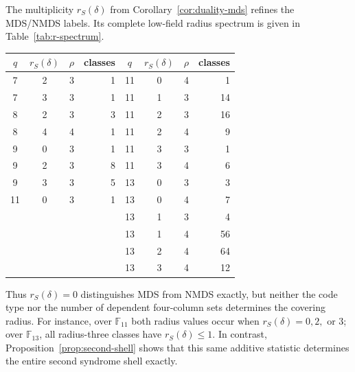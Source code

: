 \documentclass[11pt]{article}
\newcommand{\F}{\mathbb F}
\theoremstyle{plain}
\theoremstyle{definition}
\begin{document}
The multiplicity \(r_S(\delta)\) from Corollary~\ref{cor:duality-mds}
refines the MDS/NMDS labels.  Its complete low-field radius spectrum is
given in Table~\ref{tab:r-spectrum}.
\begin{center}
\label{tab:r-spectrum}
\small
\begin{tabular}{c c r r@{\qquad}c c r r}
\toprule
\(q\)&\(r_S(\delta)\)&\(\rho\)&classes&
\(q\)&\(r_S(\delta)\)&\(\rho\)&classes\\
\midrule
7&2&3&1  & 11&0&4&1\\
7&3&3&1  & 11&1&3&14\\
8&2&3&3  & 11&2&3&16\\
8&4&4&1  & 11&2&4&9\\
9&0&3&1  & 11&3&3&1\\
9&2&3&8  & 11&3&4&6\\
9&3&3&5  & 13&0&3&3\\
11&0&3&1 & 13&0&4&7\\
          & & & & 13&1&3&4\\
          & & & & 13&1&4&56\\
          & & & & 13&2&4&64\\
          & & & & 13&3&4&12\\
\bottomrule
\end{tabular}
\end{center}
Thus \(r_S(\delta)=0\) distinguishes MDS from NMDS exactly, but neither
the code type nor the number of dependent four-column sets determines the
covering radius.  For instance, over \(\F_{11}\) both radius values occur
when \(r_S(\delta)=0,2,\) or \(3\); over \(\F_{13}\), all radius-three
classes have \(r_S(\delta)\le1\).
In contrast, Proposition~\ref{prop:second-shell} shows that this same
additive statistic determines the entire second syndrome shell exactly.
\end{document}
